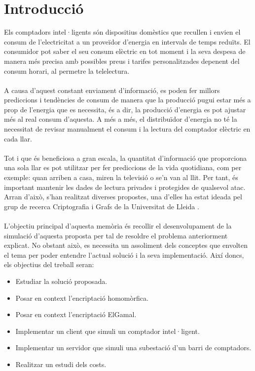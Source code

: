 \documentclass{article}
\begin{document}
\part{Introducció}
Els comptadors intel·ligents són dispositius domèstics que recullen i envien 
el consum de l'electricitat a un proveïdor d’energia en intervals de temps reduïts. El consumidor pot saber el seu consum elèctric en tot moment i la seva despesa de manera més precisa amb possibles preus i tarifes personalitzades depenent del consum horari, al permetre la telelectura.
\\
\\
A causa d'aquest constant enviament d'informació,
es poden fer millors prediccions i tendències de consum de manera que la producció pugui estar més a prop de l'energia que es necessita, és a dir, la producció d'energia es pot ajustar més al real consum d'aquesta. A més a més, el distribuïdor d'energia no té la necessitat de revisar manualment el consum i la lectura del comptador elèctric en cada llar.
\\
\\
Tot i que és beneficiosa a gran escala, la quantitat d'informació que proporciona una sola llar es pot utilitzar per fer prediccions de la vida quotidiana, com per exemple: quan arriben a casa, miren la televisió o se'n van al llit. Per tant, és important mantenir les dades de lectura privades i protegides de qualsevol atac. Arran d'això, s'han realitzat diverses propostes, una d'elles ha estat ideada pel grup de recerca Criptografia i Grafs de la Universitat de Lleida \cite{recsi}.
\\\\
L'objectiu principal d'aquesta memòria és recollir el desenvolupament de la simulació d'aquesta proposta per tal de resoldre el problema anteriorment explicat. No obstant això, es necessita un assoliment dels conceptes que envolten el tema per poder entendre l'actual solució i la seva implementació. Així doncs, els objectius del treball seran:
\begin{itemize}
	\item Estudiar la solució proposada.
	\item Posar en context l'encriptació homomòrfica.
	\item Posar en context l'encriptació ElGamal.
	\item Implementar un client que simuli un comptador intel·ligent.
	\item Implementar un servidor que simuli una subestació d'un barri de comptadors.
	\item Realitzar un estudi dels costs.
\end{itemize}
\end{document}
